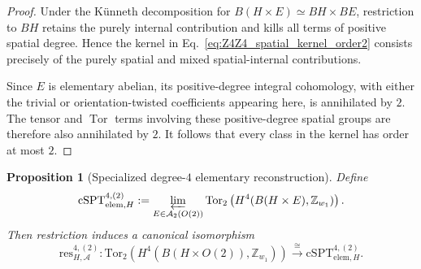 \documentclass[aps,prx,reprint,superscriptaddress,twocolumn,amsmath,amssymb,amsfonts, nofootinbib]{revtex4-2}
\newcommand{\res}{\text{res}}
\newcommand{\tor}{\text{Tor}}
\theoremstyle{apsstyle}
\newtheorem{proposition}[theorem]{Proposition}
\begin{document}
\begin{proof}
Under the K\"unneth decomposition for
$B(H\times E)\simeq BH\times BE$, restriction to $BH$ retains the
purely internal contribution and kills all terms of positive spatial
degree. Hence the kernel in
Eq.~\eqref{eq:Z4Z4_spatial_kernel_order2} consists precisely of the
purely spatial and mixed spatial-internal contributions.

\medskip 

\noindent Since $E$ is elementary abelian, its positive-degree integral
cohomology, with either the trivial or orientation-twisted
coefficients appearing here, is annihilated by $2$. The tensor and
$\operatorname{Tor}$ terms involving these positive-degree spatial
groups are therefore also annihilated by $2$. It follows that every
class in the kernel has order at most $2$.
\end{proof}

\bigskip

\begin{proposition}[Specialized degree-$4$ elementary reconstruction]
\label{prop:Z4Z4_degree4_reconstruction}
Define
\begin{equation}
\mathrm{cSPT}_{\mathrm{elem},H}^{4,(2)}
:=
\varprojlim_{E\in\mathcal A_2(O(2))}
\tor_2
\left(
H^{4}(B(H\times E),\mathbb Z_{w_1})
\right).
\label{eq:Z4Z4_full_elementary_group}
\end{equation}
Then restriction induces a canonical isomorphism
\begin{equation}
\res_{H,\mathcal A}^{4,(2)}:
\tor_2
\left(
H^{4}(B(H\times O(2)),\mathbb Z_{w_1})
\right)
\xrightarrow{\;\cong\;}
\mathrm{cSPT}_{\mathrm{elem},H}^{4,(2)}.
\label{eq:Z4Z4_degree4_restriction_iso}
\end{equation}
\end{proposition}
\end{document}
